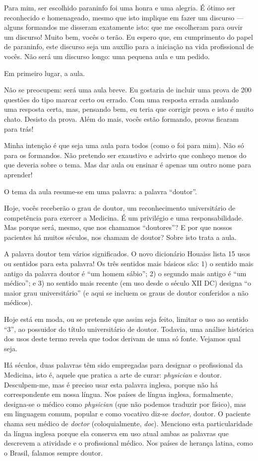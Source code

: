 \documentclass[pdftex, brazil, 12pt, oneside]{article}
\newcommand{\ingles}[1]{\textit{#1}}
\begin{document}
Para mim, ser escolhido paraninfo foi uma honra e uma alegria. É ótimo ser reconhecido
e homenageado, mesmo que isto implique em fazer um discurso --- alguns formandos me disseram
exatamente isto: que me escolheram para ouvir um discurso! Muito bem, vocês o terão. Eu
espero que, em cumprimento do papel de paraninfo, este discurso seja um auxílio para a
iniciação na vida profissional de vocês. Não será um discurso longo: uma pequena aula
e um pedido.

Em primeiro lugar, a aula.

Não se preocupem: será uma aula breve. Eu gostaria de incluir uma prova de 200 questões
do tipo marcar certo ou errado. Com uma resposta errada anulando uma resposta certa, mas,
pensando bem, eu teria que corrigir prova e isto é muito chato. Desisto da prova.
Além do mais, vocês estão formando, provas ficaram para trás!

Minha intenção é que seja uma aula para todos (como o foi para mim). Não só para os formandos.
Não pretendo ser exaustivo e advirto que conheço menos do que deveria sobre o tema.
Mas dar aula ou ensinar é apenas um outro nome para aprender!

O tema da aula resume-se em uma palavra: a palavra ``doutor''.

Hoje, vocês receberão o grau de doutor, um reconhecimento universitário de competência
para exercer a Medicina. É um privilégio e uma responsabilidade. Mas porque será, mesmo,
que nos chamamos ``doutores''? E por que nossos pacientes há muitos séculos, nos chamam
de doutor? Sobre isto trata a aula.

A palavra doutor tem vários significados. O novo dicionário Houaiss lista 15 usos ou
sentidos para esta palavra! Os três sentidos mais básicos são: 1) o sentido mais antigo
da palavra doutor é ``um homem sábio''; 2) o segundo mais antigo é ``um médico''; e
3) no sentido mais recente (em uso desde o século XII DC) designa ``o maior grau universitário''
(e aqui se incluem os graus de doutor conferidos a não médicos).

Hoje está em moda, ou se pretende que assim seja feito, limitar o uso ao sentido ``3'',
ao possuidor do título universitário de doutor. Todavia, uma análise histórica dos usos
deste termo revela que todos derivam de uma só fonte. Vejamos qual seja.

Há séculos, duas palavras têm sido empregadas para designar o profissional da Medicina, isto é,
aquele que pratica a arte de curar: \ingles{physician} e doutor. Desculpem-me, mas é preciso usar
esta palavra inglesa, porque não há correspondente em nossa língua. Nos países de língua inglesa,
formalmente, designa-se o médico como \ingles{physician} (que não podemos traduzir por físico),
mas em linguagem comum, popular e como vocativo diz-se \ingles{doctor}, doutor. O paciente chama
seu médico de \ingles{doctor} (coloquialmente, \ingles{doc}). Menciono esta particularidade da
língua inglesa porque ela conserva em uso atual ambas as palavras que descrevem a atividade e o
profissional médico. Nos países de herança latina, como o Brasil, falamos sempre doutor.
\end{document}
